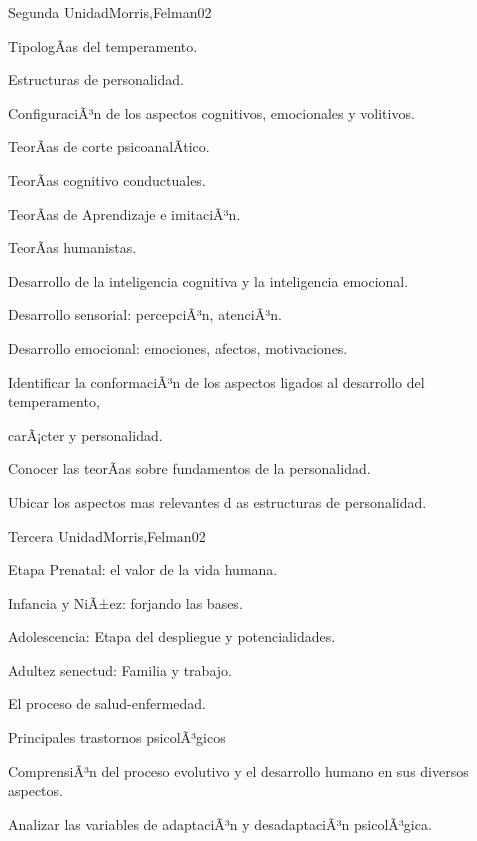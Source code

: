 \begin{syllabus}
\begin{unit}{Segunda Unidad}{Morris,Felman}{0}{2}
\begin{topics}
	\item TipologÃ­as del temperamento.
	\item Estructuras de personalidad.
	\item ConfiguraciÃ³n de los aspectos cognitivos, emocionales y volitivos.
	\item TeorÃ­as de corte psicoanalÃ­tico.
	\item TeorÃ­as cognitivo conductuales.
	\item TeorÃ­as de Aprendizaje e imitaciÃ³n.
	\item TeorÃ­as humanistas.
	\item Desarrollo de la inteligencia cognitiva y la inteligencia emocional.
	\item Desarrollo sensorial: percepciÃ³n, atenciÃ³n.
	\item Desarrollo emocional: emociones, afectos, motivaciones.
\end{topics}
\begin{unitgoals}
	\item Identificar la conformaciÃ³n de los aspectos ligados al desarrollo del temperamento,  
	\item       carÃ¡cter y personalidad.
	\item Conocer las teorÃ­as sobre fundamentos de la personalidad.
	\item Ubicar los aspectos mas relevantes d as estructuras de personalidad.
\end{unitgoals}
\end{unit}

\begin{unit}{Tercera Unidad}{Morris,Felman}{0}{2}
\begin{topics}
	\item  Etapa Prenatal: el valor de la vida humana.
	\item Infancia y NiÃ±ez: forjando las bases.
	\item Adolescencia: Etapa del despliegue y potencialidades.
	\item Adultez senectud: Familia y trabajo.
	\item El proceso de salud-enfermedad.
	\item Principales trastornos psicolÃ³gicos
\end{topics}
\begin{unitgoals}
	\item ComprensiÃ³n del proceso evolutivo y el desarrollo humano en sus diversos aspectos.
	\item Analizar las variables de adaptaciÃ³n y desadaptaciÃ³n psicolÃ³gica.
\end{unitgoals}
\end{unit}


\end{syllabus}
